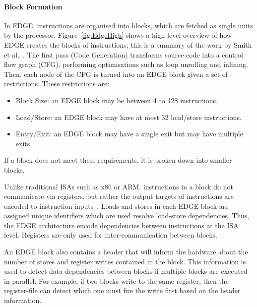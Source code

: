 \paragraph*{Block Formation}
In EDGE, instructions are organised into blocks, which are fetched as single units by the processor.
Figure~\ref{fig:EdgeHigh} shows a high-level overview of how EDGE creates the blocks of instructions; this is a summary of the work by Smith et al.~\cite{smith2006edge}. 
The first pass (Code Generation) transforms source code into a control flow graph (CFG), performing optimisations such as loop unrolling and inlining.
Then, each node of the CFG is turned into an EDGE block given a set of restrictions.
These restrictions are:
\begin{itemize}
\item Block Size: an EDGE block may be between 4 to 128 instructions.
\vspace{-1em}
\item Load/Store: an EDGE block may have at most 32 load/store instructions.
\vspace{-1em}
\item Entry/Exit: an EDGE block may have a single exit but may have multiple exits.
\end{itemize}
If a block does not meet these requirements, it is broken down into smaller blocks.

Unlike traditional ISAs such as x86 or ARM, instructions in a block do not communicate via registers, but rather the output targets of instructions are encoded to instruction inputs~\cite{smith2006edge}.
Loads and stores in each EDGE block are assigned unique identifiers which are used resolve load-store dependencies.
Thus, the EDGE architecture encode dependencies between instructions at the ISA level.
Registers are only used for inter-communication between blocks.

An EDGE block also contains a header that will inform the hardware about the number of stores and register writes contained in the block.
This information is used to detect data-dependencies between blocks if multiple blocks are executed in parallel.
For example, if two blocks write to the same register, then the register-file can detect which one must fire the write first based on the header information. 

